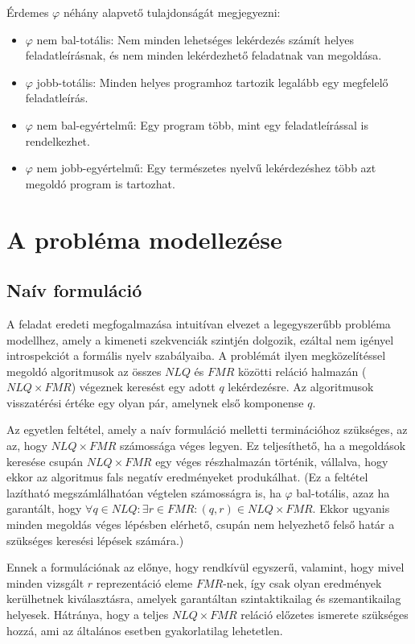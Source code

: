\documentclass[twoside, 12pt]{report}
\begin{document}
Érdemes $\varphi$ néhány alapvető tulajdonságát megjegyezni:

\begin{itemize}[noitemsep]
    \item $\varphi$ nem bal-totális: Nem minden lehetséges lekérdezés számít helyes feladatleírásnak, és nem minden lekérdezhető feladatnak van megoldása.
    \item $\varphi$ jobb-totális: Minden helyes programhoz tartozik legalább egy megfelelő feladatleírás.
    \item $\varphi$ nem bal-egyértelmű: Egy program több, mint egy feladatleírással is rendelkezhet.
    \item $\varphi$ nem jobb-egyértelmű: Egy természetes nyelvű lekérdezéshez több azt megoldó program is tartozhat.
\end{itemize}

\section{A probléma modellezése}

\subsection{Naív formuláció}

A feladat eredeti megfogalmazása intuitívan elvezet a legegyszerűbb probléma modellhez, amely a kimeneti szekvenciák szintjén dolgozik, ezáltal nem igényel introspekciót a formális nyelv szabályaiba. A problémát ilyen megközelítéssel megoldó algoritmusok az összes $NLQ$ és $FMR$ közötti reláció halmazán ($NLQ \times FMR$) végeznek keresést egy adott $q$ lekérdezésre. Az algoritmusok visszatérési értéke egy olyan pár, amelynek első komponense $q$.

Az egyetlen feltétel, amely a naív formuláció melletti terminációhoz szükséges, az az, hogy $NLQ \times FMR$ számossága véges legyen. Ez teljesíthető, ha a megoldások keresése csupán $NLQ \times FMR$ egy véges részhalmazán történik, vállalva, hogy ekkor az algoritmus fals negatív eredményeket produkálhat. (Ez a feltétel lazítható megszámlálhatóan végtelen számosságra is, ha $\varphi$ bal-totális, azaz ha garantált, hogy $\forall q \in NLQ: \exists r \in FMR: (q, r) \in NLQ \times FMR$. Ekkor ugyanis minden megoldás véges lépésben elérhető, csupán nem helyezhető felső határ a szükséges keresési lépések számára.)

Ennek a formulációnak az előnye, hogy rendkívül egyszerű, valamint, hogy mivel minden vizsgált $r$ reprezentáció eleme $FMR$-nek, így csak olyan eredmények kerülhetnek kiválasztásra, amelyek garantáltan szintaktikailag és szemantikailag helyesek. Hátránya, hogy a teljes $NLQ \times FMR$ reláció előzetes ismerete szükséges hozzá, ami az általános esetben gyakorlatilag lehetetlen.
\end{document}
